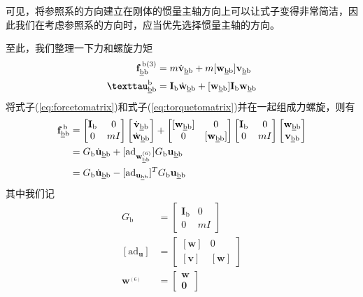 \documentclass[12pt, a4paper, article, UTF8]{ctexart}
\begin{document}
可见，将参照系的方向建立在刚体的惯量主轴方向上可以让式子变得非常简洁，因此我们在考虑参照系的方向时，应当优先选择惯量主轴的方向。

至此，我们整理一下力和螺旋力矩
\begin{align}
\mathbf{f}^{\,\text{b}(3)}_\text{\underline{b}b} &= m \dot{\mathbf{v}}_{\text{\underline{b}b}} + m [\mathbf{w}_{\text{\underline{b}b}} ] \mathbf{v}_{\text{\underline{b}b}} \label{eq:forcetomatrix}\\
\textbf{\texttau}_{\text{\underline{b}b}}^{\text{b}} &=
 \mathbf{I}_\text{b}\dot{\mathbf{w}}_{\text{\underline{b}b}} + [\mathbf{w}_{\text{\underline{b}b}} ]\mathbf{I}_\text{b}\mathbf{w}_{\text{\underline{b}b}} \label{eq:torquetomatrix}
\end{align}
将式子(\ref{eq:forcetomatrix})和式子(\ref{eq:torquetomatrix})并在一起组成力螺旋，则有
\begin{align}
\mathbf{f}_\text{\underline{b}b}^{\,\text{b}}& = \begin{bmatrix}
\mathbf{I}_\text{b} & 0\\
0 & mI
\end{bmatrix}\begin{bmatrix}
\dot{\mathbf{v}}_{\text{\underline{b}b}} \\ \dot{\mathbf{w}}_{\text{\underline{b}b}}\end{bmatrix} + \begin{bmatrix}
[\mathbf{w}_{\text{\underline{b}b}} ] & 0 \\
0 & [\mathbf{w}_{\text{\underline{b}b}} ]
\end{bmatrix}\begin{bmatrix}
\mathbf{I}_\text{b} & 0\\
0 & mI
\end{bmatrix}
\begin{bmatrix}
\mathbf{w}_{\text{\underline{b}b}}\\\mathbf{v}_{\text{\underline{b}b}}
\end{bmatrix} \nonumber \\
&= G_\text{b} \dot{\mathbf{u}}_\text{\underline{b}b} + [\text{ad}_{\mathbf{w}^{{}_{(6)}}_{\text{\underline{b}b}}}] G_\text{b} \mathbf{u}_\text{\underline{b}b} \label{eq:fmascrew1}  \\ 
&= G_\text{b} \dot{\mathbf{u}}_\text{\underline{b}b} - [\text{ad}_{\mathbf{u}_{\text{\underline{b}b}}}]^T G_\text{b} \mathbf{u}_\text{\underline{b}b} \label{eq:fmascrew2}
\end{align}
其中我们记
\begin{align}
G_\text{b} &= \begin{bmatrix}
\mathbf{I}_\text{b} & 0\\
0 & mI
\end{bmatrix}\\
[\text{ad}_\mathbf{u}] &= \begin{bmatrix}
[\mathbf{w}] & 0 \\
[\mathbf{v}] & [\mathbf{w}]
\end{bmatrix}\\
\mathbf{w}^{{}_{(6)}} &= \begin{bmatrix}
\mathbf{w}\\
\mathbf{0}
\end{bmatrix}
\end{align}
\end{document}
